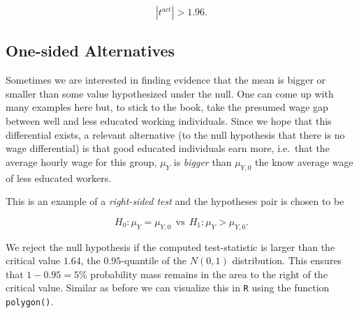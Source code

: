 \documentclass[]{book}
\theoremstyle{definition}
\theoremstyle{definition}
\theoremstyle{definition}
\theoremstyle{remark}
\begin{document}
\[ \left\lvert t^{act} \right\rvert > 1.96. \]

\subsection*{One-sided Alternatives}\label{one-sided-alternatives}

Sometimes we are interested in finding evidence that the mean is bigger
or smaller than some value hypothesized under the null. One can come up
with many examples here but, to stick to the book, take the presumed
wage gap between well and less educated working individuals. Since we
hope that this differential exists, a relevant alternative (to the null
hypothesis that there is no wage differential) is that good educated
individuals earn more, i.e.~that the average hourly wage for this group,
\(\mu_Y\) is \emph{bigger} than \(\mu_{Y,0}\) the know average wage of
less educated workers.

This is an example of a \emph{right-sided test} and the hypotheses pair
is chosen to be

\[ H_0: \mu_Y = \mu_{Y,0} \ \ \text{vs} \ \ H_1: \mu_Y > \mu_{Y,0}. \]

We reject the null hypothesis if the computed test-statistic is larger
than the critical value \(1.64\), the \(0.95\)-quantile of the
\(N(0,1)\) distribution. This ensures that \(1-0.95=5\%\) probability
mass remains in the area to the right of the critical value. Similar as
before we can visualize this in \texttt{R} using the function
\texttt{polygon()}.
\end{document}
